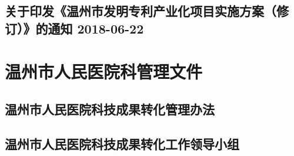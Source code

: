 \documentclass[openany]{book}
\begin{document}
\section{关于印发《温州市发明专利产业化项目实施方案（修订）》的通知 2018-06-22}
	



%

%





%



%

%



\chapter{温州市人民医院科管理文件}


\section{温州市人民医院科技成果转化管理办法}


\section{温州市人民医院科技成果转化工作领导小组}


 
\end{document}
